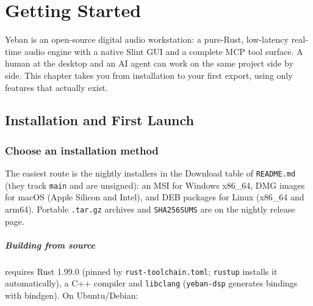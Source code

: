 
\chapter{Getting Started}
\label{ch:quickstart}






Yeban is an open-source digital audio workstation: a pure-Rust, low-latency real-time
audio engine with a native Slint GUI and a complete MCP tool surface. A human at the
desktop and an AI agent can work on the same project side by side. This chapter takes
you from installation to your first export, using only features that actually exist.

\section{Installation and First Launch}

\subsection{Choose an installation method}

The easiest route is the nightly installers in the Download table of \texttt{README.md}
(they track \texttt{main} and are unsigned): an MSI for Windows x86\_64, DMG images for
macOS (Apple Silicon and Intel), and DEB packages for Linux (x86\_64 and arm64).
Portable \texttt{.tar.gz} archives and \texttt{SHA256SUMS} are on the nightly release page.

\paragraph{Building from source} requires Rust 1.99.0 (pinned by
\texttt{rust-toolchain.toml}; \texttt{rustup} installs it automatically), a C++
compiler and \texttt{libclang} (\texttt{yeban-dsp} generates bindings with bindgen).
On Ubuntu/Debian:

